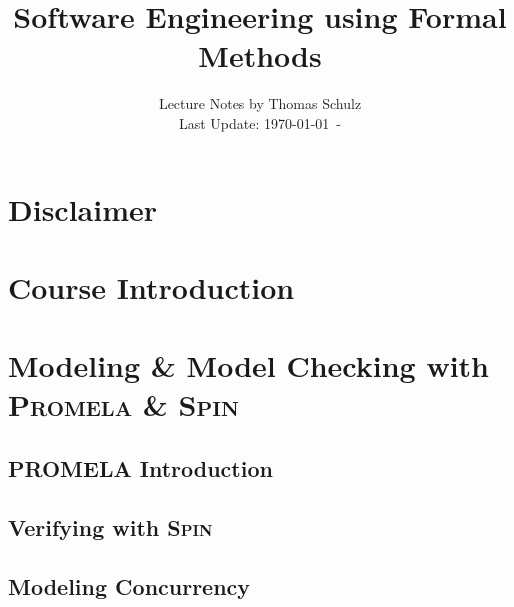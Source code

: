 \documentclass[12pt,accentcolor=tud1b,bibtotoc,colorback,linedtoc,liststotoc,bigchapter,noresetcounter]{tudreport}
\title{Software Engineering using Formal Methods}
\subtitle{Lecture Notes by Thomas Schulz\\
Last Update: \today \ - \thistime}
\newcommand{\capitals}[1]{\textsc{#1}}
\begin{document}
 

\maketitle
\tableofcontents


\begin{acronym}[Promela]
\setlength{\itemsep}{-\parsep}
\end{acronym}


\chapter*{Disclaimer}

\newpage

\chapter*{Course Introduction}

\newpage



\chapter{Modeling \& Model Checking with \capitals{Promela} \& \capitals{Spin}}


\section{PROMELA Introduction}

\newpage

\section{Verifying with \capitals{Spin}}

\newpage

\section{Modeling Concurrency}
\end{document}
